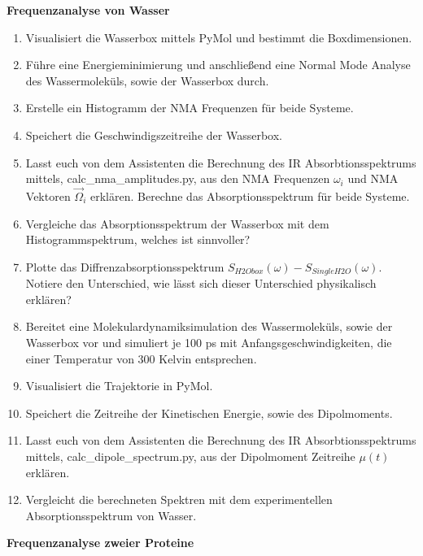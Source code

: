\documentclass[a4paper,12pt]{article}
\begin{document}
\textbf{Frequenzanalyse von Wasser}
\begin{enumerate}
 \item Visualisiert die Wasserbox mittels PyMol und bestimmt die Boxdimensionen.
 \item Führe eine Energieminimierung und anschließend eine Normal Mode Analyse des Wassermoleküls, sowie der Wasserbox durch.
 \item Erstelle ein Histogramm der NMA Frequenzen für beide Systeme.
 \item Speichert die Geschwindigszeitreihe der Wasserbox.
 \item Lasst euch von dem Assistenten die Berechnung des IR Absorbtionsspektrums mittels, calc\_nma\_amplitudes.py, aus den NMA Frequenzen $\omega_i$ und NMA Vektoren $\vec{\Omega}_i$ erklären.
 Berechne das Absorptionsspektrum für beide Systeme.
 \item Vergleiche das Absorptionsspektrum der Wasserbox mit dem Histogrammspektrum, welches ist sinnvoller?
 \item Plotte das Diffrenzabsorptionsspektrum $S_{H2Obox}(\omega)-S_{SingleH2O}(\omega)$. Notiere den Unterschied, wie lässt sich dieser Unterschied physikalisch erklären?
 \item Bereitet eine Molekulardynamiksimulation des Wassermoleküls, sowie der Wasserbox vor und simuliert je 100 ps mit Anfangsgeschwindigkeiten, die einer Temperatur von 300 Kelvin entsprechen.
 \item Visualisiert die Trajektorie in PyMol.
 \item Speichert die Zeitreihe der Kinetischen Energie, sowie des Dipolmoments. 
 \item Lasst euch von dem Assistenten die Berechnung des IR Absorbtionsspektrums mittels, calc\_dipole\_spectrum.py, aus der Dipolmoment Zeitreihe $\mu(t)$ erklären.
 \item Vergleicht die berechneten Spektren mit dem experimentellen Absorptionsspektrum von Wasser.
\end{enumerate}

\textbf{Frequenzanalyse zweier Proteine}
\end{document}
